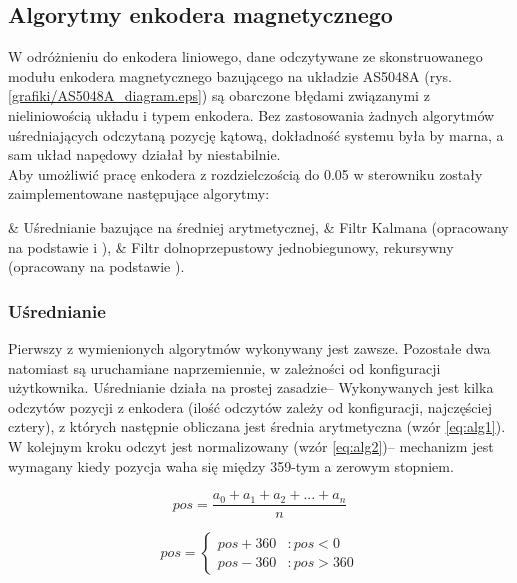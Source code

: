 \subsection{Algorytmy enkodera magnetycznego}

W odróżnieniu do enkodera liniowego, dane odczytywane ze skonstruowanego modułu enkodera magnetycznego bazującego na układzie AS5048A (rys. \ref{grafiki/AS5048A_diagram.eps}) są obarczone błędami związanymi z nieliniowością układu i typem enkodera. Bez zastosowania żadnych algorytmów uśredniających odczytaną pozycję kątową, dokładność systemu była by marna, a sam układ napędowy działał by niestabilnie. \\

Aby umożliwić pracę enkodera z rozdzielczością do 0.05\degree{} w sterowniku zostały zaimplementowane następujące algorytmy:

\begin{easylist}
	& Uśrednianie bazujące na średniej arytmetycznej,
	& Filtr Kalmana (opracowany na podstawie \cite{kalman} i \cite{forbot}),
	& Filtr dolnoprzepustowy jednobiegunowy, rekursywny (opracowany na podstawie \cite{smith}).
	\\
\end{easylist} 

\subsubsection{Uśrednianie}

Pierwszy z wymienionych algorytmów wykonywany jest zawsze. Pozostałe dwa natomiast są uruchamiane naprzemiennie, w zależności od konfiguracji użytkownika. Uśrednianie działa na prostej zasadzie-- Wykonywanych jest kilka odczytów pozycji z enkodera (ilość odczytów zależy od konfiguracji, najczęściej cztery), z których następnie obliczana jest średnia arytmetyczna (wzór \ref{eq:alg1}). W kolejnym kroku odczyt jest normalizowany (wzór \ref{eq:alg2})-- mechanizm jest wymagany kiedy pozycja waha się między 359-tym a zerowym stopniem.

\begin{equation} \label{eq:alg1}
	pos = \frac{a_0 + a_1 + a_2 + ... + a_n}{n} 
\end{equation}

\begin{equation} \label{eq:alg2}
pos = \left\{
  \begin{array}{ll}
    pos + 360 & : pos < 0 \\
    pos - 360 & : pos > 360
  \end{array}
\right.
\end{equation}

